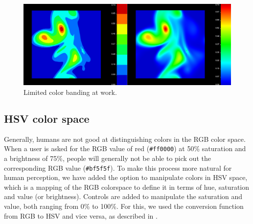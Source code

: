 		\begin{figure}[htb]
			\centering
			\includegraphics[width=\linewidth]{./content/pictures/limit_colors.png}
			\caption{Limited color banding at work.}
			\label{fig:banded_difference}
		\end{figure}

	\subsection{HSV color space}
		Generally, humans are not good at distinguishing colors in the RGB color space. 
		When a user is asked for the RGB value of red (\texttt{\#ff0000}) at 50\% saturation and a brightness of 75\%, people will generally not be able to pick out the corresponding RGB value (\texttt{\#bf5f5f}).
		To make this process more natural for human perception, we have added the option to manipulate colors in HSV space, which is a mapping of the RGB colorspace to define it in terms of hue, saturation and value (or brightness).
		Controls are added to manipulate the saturation and value, both ranging from 0\% to 100\%.
		For this, we used the conversion function from RGB to HSV and vice versa, as described in \cite{telea2014data}.

